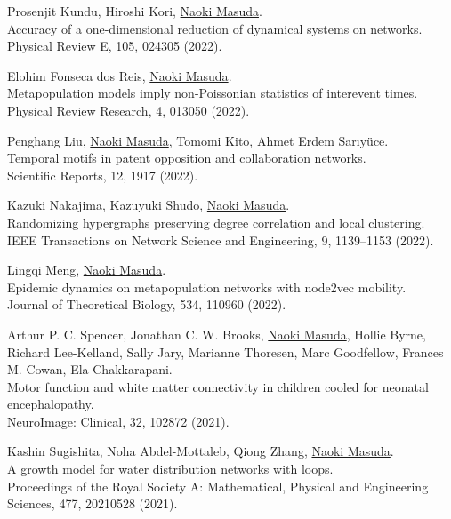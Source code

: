 \documentclass[11pt,letter]{article}
\begin{document}
\begin{etaremune}
\item Prosenjit Kundu, Hiroshi Kori, \underline{Naoki Masuda}.\\
Accuracy of a one-dimensional reduction of dynamical systems on networks.\\
Physical Review E, 105, 024305 (2022).

\item Elohim Fonseca dos Reis, \underline{Naoki Masuda}.\\
Metapopulation models imply non-Poissonian statistics of interevent times.\\
Physical Review Research, 4, 013050 (2022).

\item Penghang Liu, \underline{Naoki Masuda}, Tomomi Kito, Ahmet Erdem Sar{\i}y\"{u}ce.\\
Temporal motifs in patent opposition and collaboration networks.\\
Scientific Reports, 12, 1917 (2022).


\item Kazuki Nakajima, Kazuyuki Shudo, \underline{Naoki Masuda}.\\
Randomizing hypergraphs preserving degree correlation and local clustering.\\
IEEE Transactions on Network Science and Engineering, 9, 1139--1153 (2022).

\item Lingqi Meng, \underline{Naoki Masuda}.\\
Epidemic dynamics on metapopulation networks with node2vec mobility.\\
Journal of Theoretical Biology, 534, 110960 (2022).

\item Arthur P. C. Spencer, Jonathan C. W. Brooks, \underline{Naoki Masuda}, Hollie Byrne, Richard Lee-Kelland, Sally Jary, Marianne Thoresen, Marc Goodfellow, Frances M. Cowan, Ela Chakkarapani.\\
Motor function and white matter connectivity in children cooled for neonatal encephalopathy.\\
NeuroImage: Clinical, 32, 102872 (2021).

\item Kashin Sugishita, Noha Abdel-Mottaleb, Qiong Zhang, \underline{Naoki Masuda}.\\
A growth model for water distribution networks with loops.\\
Proceedings of the Royal Society A: Mathematical, Physical and Engineering Sciences, 477, 20210528 (2021).


\end{etaremune}
\end{document}
